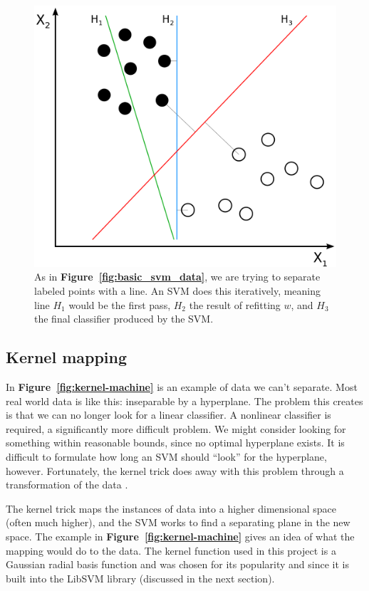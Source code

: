\documentclass[11pt]{article} %
\begin{document}
\begin{figure}[h]
  \centering
  \includegraphics[scale=.5]{images/Svm_separating_hyperplanes.png}
  \caption{As in \textbf{Figure~\ref{fig:basic_svm_data}}, we are trying to separate
    labeled points with a line. An SVM does this iteratively, meaning line $H_1$
    would be the first pass, $H_2$ the result of refitting $w$, and $H_3$ the final 
    classifier produced by the SVM.}
  \label{fig:training_hyperplanes}
\end{figure}

\subsection{Kernel mapping}
\label{sec:kernels}
In \textbf{Figure~\ref{fig:kernel-machine}} is an example of data we can't separate.
Most real world data is like this: inseparable by a hyperplane. The problem this
creates is that we can no longer look for a linear classifier. A nonlinear 
classifier is required, a significantly more difficult problem. We might consider 
looking for something within reasonable bounds, since no optimal
hyperplane exists. It is difficult to formulate how long an SVM should ``look'' 
for the hyperplane, however. Fortunately, the kernel trick does away with this 
problem through a transformation of the data \cite{aizerman1964theoretical}.

The kernel trick maps the instances of data into a higher dimensional space 
(often much higher), and the SVM works to find a separating plane in the new 
space. The example in \textbf{Figure~\ref{fig:kernel-machine}} gives an idea
of what the mapping would do to the data. The kernel function used in this 
project is a Gaussian radial basis function and was chosen for its popularity
and since it is built into the LibSVM library \cite{chang2011libsvm} (discussed in
the next section). 
\end{document}
